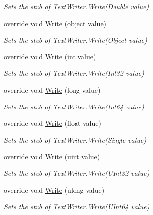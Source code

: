 \begin{DoxyCompactItemize}
\begin{DoxyCompactList}\small\item\em Sets the stub of Text\-Writer.\-Write(\-Double value)\end{DoxyCompactList}\item 
override void \hyperlink{class_system_1_1_i_o_1_1_fakes_1_1_stub_stream_writer_af5fde7ddd08e4602a733f57b65110c32}{Write} (object value)
\begin{DoxyCompactList}\small\item\em Sets the stub of Text\-Writer.\-Write(\-Object value)\end{DoxyCompactList}\item 
override void \hyperlink{class_system_1_1_i_o_1_1_fakes_1_1_stub_stream_writer_a89f2e2a4842e4aba0f579acc1745a6da}{Write} (int value)
\begin{DoxyCompactList}\small\item\em Sets the stub of Text\-Writer.\-Write(\-Int32 value)\end{DoxyCompactList}\item 
override void \hyperlink{class_system_1_1_i_o_1_1_fakes_1_1_stub_stream_writer_a205ec34e96a05546582b7db306cd07ca}{Write} (long value)
\begin{DoxyCompactList}\small\item\em Sets the stub of Text\-Writer.\-Write(\-Int64 value)\end{DoxyCompactList}\item 
override void \hyperlink{class_system_1_1_i_o_1_1_fakes_1_1_stub_stream_writer_a4e3042d82527a129df02a70036a58bb8}{Write} (float value)
\begin{DoxyCompactList}\small\item\em Sets the stub of Text\-Writer.\-Write(\-Single value)\end{DoxyCompactList}\item 
override void \hyperlink{class_system_1_1_i_o_1_1_fakes_1_1_stub_stream_writer_a795a2da9adda410e21c97422aaa17fa8}{Write} (uint value)
\begin{DoxyCompactList}\small\item\em Sets the stub of Text\-Writer.\-Write(\-U\-Int32 value)\end{DoxyCompactList}\item 
override void \hyperlink{class_system_1_1_i_o_1_1_fakes_1_1_stub_stream_writer_a8ef4788e6f1d1747baf1824df832de09}{Write} (ulong value)
\begin{DoxyCompactList}\small\item\em Sets the stub of Text\-Writer.\-Write(\-U\-Int64 value)\end{DoxyCompactList}\item 

\end{DoxyCompactItemize}
